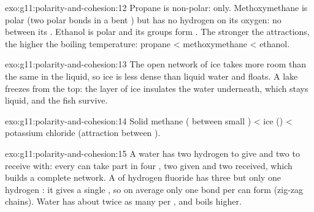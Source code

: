 \begin{solution}{exo:g11:polarity-and-cohesion:12}
Propane is non-polar:  only. Methoxymethane is
polar (two polar  bonds in a bent ) but has no
hydrogen on its oxygen: no  between its . Ethanol
is polar and its  groups form . The stronger the
attractions, the higher the boiling temperature: propane < methoxymethane
< ethanol.
\end{solution}

\begin{solution}{exo:g11:polarity-and-cohesion:13}
The open network of ice takes more room than the same  in the
liquid, so ice is less dense than liquid water and floats. A lake freezes
from the top: the layer of ice insulates the water underneath, which
stays liquid, and the fish survive.
\end{solution}

\begin{solution}{exo:g11:polarity-and-cohesion:14}
Solid methane ( between small ) <
ice () < potassium chloride (attraction between ).
\end{solution}

\begin{solution}{exo:g11:polarity-and-cohesion:15}
A water  has two hydrogen  to give and two  to
receive with: every  can take part in four , two
given and two received, which builds a complete network. A  of
hydrogen fluoride has three  but only one hydrogen : it
gives a single , so on average only one bond per 
can form (zig-zag chains). Water has about twice as many 
per , and boils higher.
\end{solution}

